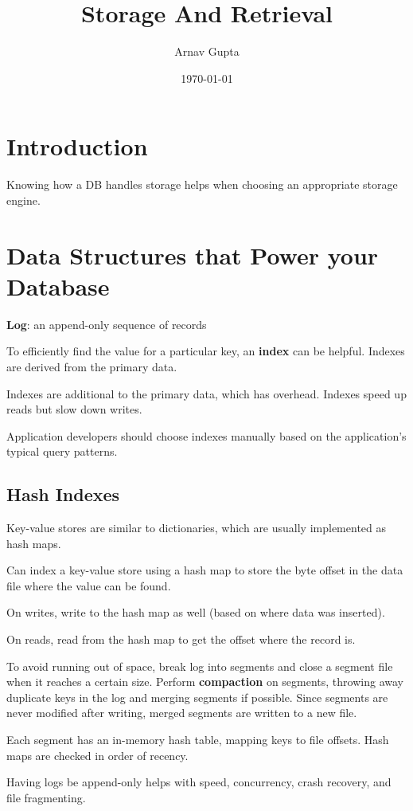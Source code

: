 \documentclass[11pt]{article}
\author{Arnav Gupta}
\date{\today}
\title{Storage And Retrieval}
\begin{document}
\maketitle
\tableofcontents

\section{Introduction}
\label{sec:orgb5fc854}
Knowing how a DB handles storage helps when choosing an appropriate
storage engine.
\section{Data Structures that Power your Database}
\label{sec:org95804f7}
\textbf{Log}: an append-only sequence of records

To efficiently find the value for a particular key, an \textbf{index} can be
helpful.
Indexes are derived from the primary data.

Indexes are additional to the primary data, which has overhead.
Indexes speed up reads but slow down writes.

Application developers should choose indexes manually based on the
application's typical query patterns.
\subsection{Hash Indexes}
\label{sec:org5727b43}
Key-value stores are similar to dictionaries, which are usually
implemented as hash maps.

Can index a key-value store using a hash map to store the
byte offset in the data file where the value can be found.

On writes, write to the hash map as well (based on where data
was inserted).

On reads, read from the hash map to get the offset where the record is.

To avoid running out of space, break log into segments and close a segment
file when it reaches a certain size.
Perform \textbf{compaction} on segments, throwing away duplicate keys in the log
and merging segments if possible.
Since segments are never modified after writing, merged segments are
written to a new file.

Each segment has an in-memory hash table, mapping keys to file offsets.
Hash maps are checked in order of recency.

Having logs be append-only helps with speed, concurrency, crash recovery,
and file fragmenting.
\end{document}
